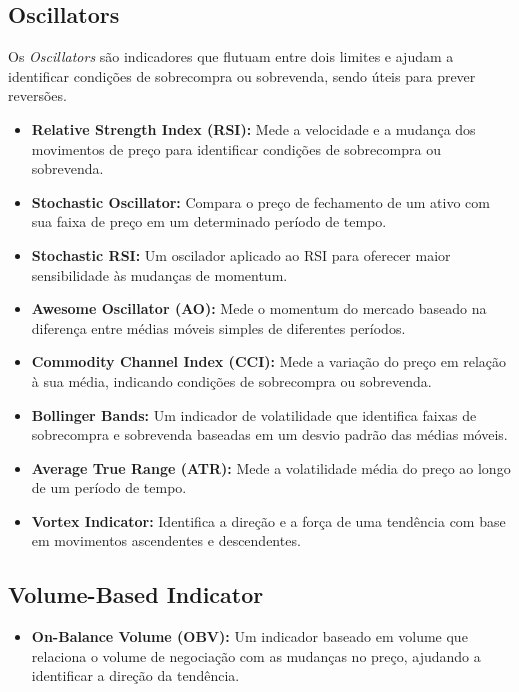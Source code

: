 \documentclass{article}
\begin{document}
\subsection{Oscillators}

Os \textit{Oscillators} são indicadores que flutuam entre dois limites e ajudam a identificar condições de sobrecompra ou sobrevenda, sendo úteis para prever reversões.

\begin{itemize}
    \item \textbf{Relative Strength Index (RSI):} Mede a velocidade e a mudança dos movimentos de preço para identificar condições de sobrecompra ou sobrevenda.

    \item \textbf{Stochastic Oscillator:} Compara o preço de fechamento de um ativo com sua faixa de preço em um determinado período de tempo.

    \item \textbf{Stochastic RSI:} Um oscilador aplicado ao RSI para oferecer maior sensibilidade às mudanças de momentum.

    \item \textbf{Awesome Oscillator (AO):} Mede o momentum do mercado baseado na diferença entre médias móveis simples de diferentes períodos.

    \item \textbf{Commodity Channel Index (CCI):} Mede a variação do preço em relação à sua média, indicando condições de sobrecompra ou sobrevenda.

    \item \textbf{Bollinger Bands:} Um indicador de volatilidade que identifica faixas de sobrecompra e sobrevenda baseadas em um desvio padrão das médias móveis.

    \item \textbf{Average True Range (ATR):} Mede a volatilidade média do preço ao longo de um período de tempo.

    \item \textbf{Vortex Indicator:} Identifica a direção e a força de uma tendência com base em movimentos ascendentes e descendentes.
\end{itemize}

\subsection{Volume-Based Indicator}

\begin{itemize}
    \item \textbf{On-Balance Volume (OBV):} Um indicador baseado em volume que relaciona o volume de negociação com as mudanças no preço, ajudando a identificar a direção da tendência.
\end{itemize}
\end{document}
